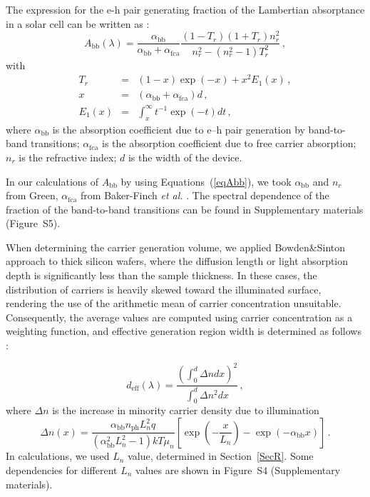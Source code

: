 \documentclass{WileyMSP-template}
\begin{document}
The expression for the e-h pair generating fraction of the Lambertian absorptance in a solar cell
can be written as \cite{Schaefer2018}:
\begin{equation}
\label{eqAbb}
A_\mathrm{bb}(\lambda)=\frac{\alpha_\mathrm{bb}}{\alpha_\mathrm{bb}+\alpha_\mathrm{fca}}\frac{(1-T_r)(1+T_r)n_r^2}{n_r^2-(n_r^2-1)T_r^2}\,,
\end{equation}
with
\begin{eqnarray*}
T_r&=&(1-x)\exp(-x)+x^2E_1(x)\,,\\
x&=&(\alpha_\mathrm{bb}+\alpha_\mathrm{fca})d\,,\\
E_1(x)&=&\int_x^\infty t^{-1}\exp(-t)dt\,,
\end{eqnarray*}
where
$\alpha_\mathrm{bb}$ is the absorption coefficient due to e–h pair
generation by band-to-band transitions;
$\alpha_\mathrm{fca}$ is the absorption coefficient due to free carrier absorption;
$n_r$ is the refractive index;
$d$ is the width of the device.

In our calculations of $A_\mathrm{bb}$ by using Equations~(\ref{eqAbb}), we took  $\alpha_\mathrm{bb}$ and
$n_r$ from Green\cite{Green2022}, $\alpha_\mathrm{fca}$  from Baker-Finch \emph{et al.} \cite{SiFCA}.
The spectral dependence of the fraction of the band-to-band transitions can be found in Supplementary materials (Figure~S5).

When determining the carrier generation volume, we applied Bowden\&Sinton  approach \cite{Bowden2007} to thick silicon wafers,
where the diffusion length or light absorption depth is significantly less than the sample thickness.
In these cases, the distribution of carriers is heavily skewed toward the illuminated surface,
rendering the use of the arithmetic mean of carrier concentration unsuitable.
Consequently, the average values are computed using carrier concentration as a weighting function,
and effective generation region width is determined as follows \cite{Bowden2007}:

\begin{equation}
\label{eqdeff}
d_\mathrm{eff}(\lambda)=\frac{\left(\int_0^d \Delta n dx\right)^2}{\int_0^d \Delta n^2 dx}\,,
\end{equation}
where
$\Delta n$ is the increase in minority carrier density due to illumination
\begin{equation}
\label{eqdeln}
\Delta n (x)=\frac{\alpha_\mathrm{bb} n_\mathrm{ph} L_n^2 q}{(\alpha_\mathrm{bb}^2 L_n^2-1)kT\mu_n}
\left[\exp\left(-\frac{x}{L_n}\right)-\exp\left(-\alpha_\mathrm{bb} x\right)\right]\,.
\end{equation}
In calculations, we used $L_n$ value, determined in Section~\ref{SecR}.
Some dependencies for different $L_n$ values are shown in Figure~S4 (Supplementary materials).
\end{document}
